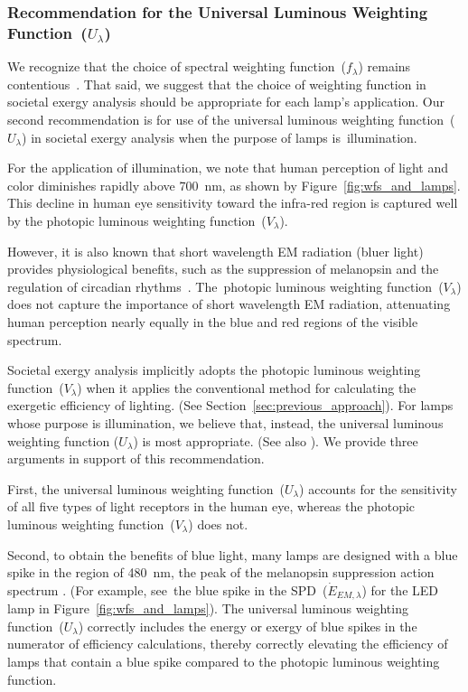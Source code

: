 \documentclass[energies,article,accept,moreauthors,pdftex]{Definitions/mdpi}\usepackage[]{graphicx}\usepackage[]{color}
\newcommand{\del}[1]{}
\providecommand{\DIFdelbegin}{} %
\providecommand{\DIFdelend}{} %
\newcommand{\DIFscaledelfig}{0.5}
\newlength{\DIFdelgraphicswidth} %
\newlength{\DIFdelgraphicsheight} %
\newcommand{\DIFdelincludegraphics}[2][]{%
\sbox{\DIFdelgraphicsbox}{\DIFOincludegraphics[#1]{#2}}%
\settoboxwidth{\DIFdelgraphicswidth}{\DIFdelgraphicsbox} %
\settoboxtotalheight{\DIFdelgraphicsheight}{\DIFdelgraphicsbox} %
\scalebox{\DIFscaledelfig}{%
\parbox[b]{\DIFdelgraphicswidth}{\usebox{\DIFdelgraphicsbox}\\[-\baselineskip] \rule{\DIFdelgraphicswidth}{0em}}\llap{\resizebox{\DIFdelgraphicswidth}{\DIFdelgraphicsheight}{%
\setlength{\unitlength}{\DIFdelgraphicswidth}%
\begin{picture}(1,1)%
\thicklines\linethickness{2pt} %
{\color[rgb]{1,0,0}\put(0,0){\framebox(1,1){}}}%
{\color[rgb]{1,0,0}\put(0,0){\line( 1,1){1}}}%
{\color[rgb]{1,0,0}\put(0,1){\line(1,-1){1}}}%
\end{picture}%
}\hspace*{3pt}}} %
} %
\DeclareRobustCommand{\DIFdelbegin}{\DIFOdelbegin \let\includegraphics\DIFdelincludegraphics} %
\DeclareRobustCommand{\DIFdelend}{\DIFOaddend \let\includegraphics\DIFOincludegraphics} %
\begin{document}
\subsubsection{Recommendation for the Universal Luminous Weighting Function~($U_\lambda$)} 
\label{sec:reccuniv}

We recognize that the choice of spectral weighting function~($f_\lambda$)
remains contentious~\cite{Delgado-Bonal:2017aa, Pattison2018LEDphotons, Rea2018, Royer2016}.
That said, we suggest that the choice of weighting function \DIFdelbegin %
\DIFdelend in societal exergy analysis
should be appropriate for each lamp's application.
Our second recommendation is for use of
the universal luminous weighting function~($U_\lambda$) in societal exergy analysis
when the purpose of lamps \mbox{is illumination}.

For the application of illumination, 
we note that human perception of light and color diminishes rapidly above 700~nm,
as shown by Figure~\ref{fig:wfs_and_lamps}.
This decline in human eye sensitivity toward the infra-red region
is captured well by the photopic luminous weighting function~($V_\lambda$).

However, it is also known that short wavelength EM radiation (bluer light)
provides physiological benefits, such as
the suppression of melanopsin and 
the regulation of circadian rhythms~\citep{Pattison2018LEDphotons}.
\mbox{The photopic} luminous weighting function~($V_\lambda$) does not
capture the importance of short wavelength EM radiation, 
attenuating human perception nearly equally in the blue and red regions
of the visible spectrum.

Societal exergy analysis implicitly adopts the photopic luminous weighting function~($V_\lambda$)
when it applies the conventional method for calculating the exergetic efficiency of lighting.
(See Section~\ref{sec:previous_approach}).
For lamps whose purpose is illumination, 
we believe that, instead, the universal luminous weighting function ($U_\lambda$)
is most appropriate.
(See also \citet{Rea2018}).
We provide three arguments in support of this recommendation.

First, 
the universal luminous weighting function~($U_\lambda$)
accounts for the sensitivity of all five types of light receptors in the human eye,
whereas the photopic luminous weighting function~($V_\lambda$) does not.

Second,
to obtain the benefits of blue light, 
many lamps are designed with a blue spike 
in the region of 480~nm, 
the peak of the melanopsin suppression action spectrum \cite{lucas2014}.
(For example, \mbox{see the} blue spike in the SPD~($\dot{E}_{EM,\lambda}$)
for the LED lamp in Figure~\ref{fig:wfs_and_lamps}).
The universal luminous weighting function~($U_\lambda$)
correctly includes the energy or exergy of blue spikes
in the numerator of efficiency calculations,
thereby correctly elevating the efficiency of lamps that contain a blue spike
compared to the photopic luminous weighting function.
\end{document}
